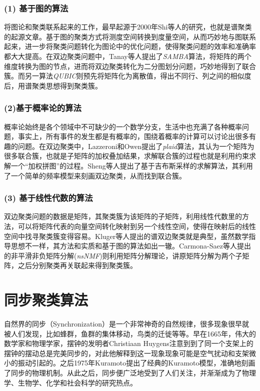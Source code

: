 \subsubsection*{(1) 基于图的算法}
将图论和聚类联系起来的工作，最早起源于2000年Shi等人\cite{shi2000normalized}的研究，也就是谱聚类的起源文章。基于图的聚类方式将测度空间转换到度量空间，从而巧妙地与图联系起来，进一步将聚类问题转化为图论中的优化问题，使得聚类问题的效率和准确率都大大提高。在双边聚类问题中，Tanay等人\cite{tanay2002discovering}提出了\emph{SAMBA}算法，将矩阵的两个维度转换为图的节点，进而将双边聚类转化为二分图划分问题，巧妙地得到了联合簇。而另一算法\emph{QUBIC}\cite{li2009qubic}则预先将矩阵化为离散值，得出不同行、列之间的相似度后，用谱聚类思想得到聚类簇。

\subsubsection*{(2)基于概率论的算法}
概率论始终是各个领域中不可缺少的一个数学分支，生活中也充满了各种概率问题，事实上，所有事件的发生都是有概率的，围绕着概率的计算可以讨论出很多有趣的问题。在双边聚类中，Lazzeroni和Owen\cite{lazzeroni2002plaid}提出了\emph{plaid}算法，其认为一个矩阵为很多联合簇，也就是子矩阵的加权叠加结果，求解联合簇的过程也就是利用约束求解一个“加权拼图”的过程。Sheng等人\cite{sheng2003biclustering}提出了基于吉布斯采样的求解算法，其利用了一个简单的频率模型来刻画双边聚类，从而找到联合簇。

\subsubsection*{(3) 基于线性代数的算法}
双边聚类问题的数据是矩阵，其聚类簇为该矩阵的子矩阵，利用线性代数里的方法，可以将矩阵代表的向量空间转化映射到另一个线性空间，使得在映射后的线性空间中找寻聚类簇变得容易。Kluger等人\cite{kluger2003spectral}提出的谱双边聚类就是典型，虽然数学指导思想不一样，其方法和实质和基于图的算法如出一辙。Carmona-Saez等人\cite{carmona2006biclustering}提出的非平滑非负矩阵分解(\emph{nsNMF})则利用矩阵分解理论，讲原矩阵分解为两个子矩阵，之后分别聚类再关联起来得到聚类簇。


\section{同步聚类\Sync{}算法}
\label{sec:sync}
自然界的同步（Synchronization）是一个非常神奇的自然规律，很多现象很早就被人们发现，比如蜂群，鱼群的集体移动，鸟类的迁徙等等\cite{frisch1994social}。早在1665年，伟大的数学家和物理学家，摆钟的发明者Christiaan Huygens\cite{huygens1966horologium}注意到到了同一个支架上的摆钟的摆动总是完美同步的，对此他解释到这一现象现象可能是空气扰动和支架微小的振动引起的。之后1975年Kuramoto\cite{kuramoto2012chemical}提出了经典的Kuramoto模型，准确地刻画了同步的物理机制。从此之后，同步便广泛地受到了人们关注，并渐渐成为了物理学、生物学、化学和社会科学的研究热点。

